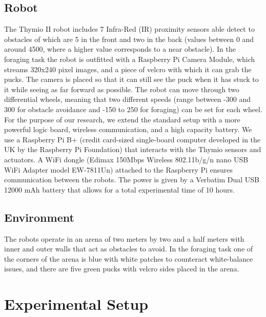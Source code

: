 \documentclass{article}
\begin{document}
	\subsection{Robot} %
	\label{sub:Robot}
	The Thymio II robot includes 7 Infra-Red (IR) proximity sensors able detect
	to obstacles of which are 5 in the front and two in the back (values
	between 0 and around 4500, where a higher value corresponds to a near
	obstacle).
	In the foraging task the robot is outfitted with a Raspberry Pi Camera
	Module, which streams 320x240 pixel images, and a piece of velcro with
	which it can grab the pucks. The camera is placed so that it can still see
	the puck when it has stuck to it while seeing as far forward as possible.
	The robot can move through two differential wheels, meaning that two
	different speeds (range between -300 and 300 for obstacle avoidance and
	-150 to 250 for foraging) can be set for each wheel. For the purpose of our
	research, we extend the standard setup with a more powerful logic board,
	wireless communication, and a high capacity battery. We use a Raspberry Pi
	B+ (credit card-sized single-board computer developed in the UK by the
	Raspberry Pi Foundation) that interacts with the Thymio sensors and
	actuators. A WiFi dongle (Edimax 150Mbps Wireless 802.11b/g/n nano USB WiFi
	Adapter model EW-7811Un) attached to the Raspberry Pi ensures communication
	between the robots. The power is given by a Verbatim Dual USB 12000 mAh
	battery that allows for a total experimental time of 10 hours.

	\subsection{Environment} %
	\label{sub:Environment}
	The robots operate in an arena of two meters by two and a half meters with
	inner and outer walls that act as obstacles to avoid.
	In the foraging task one of the corners of the arena is blue with white
	patches to counteract white-balance issues, and there are five green pucks
	with velcro sides placed in the arena.

	\section{Experimental Setup} %
	\label{sec:Experimental Setup}




\end{document}
